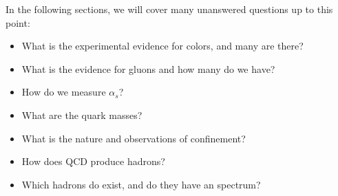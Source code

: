 In the following sections, we will cover many unanswered questions up to this point:
 
\begin{itemize}
    \item What is the experimental evidence for colors, and many are there?
    \item What is the evidence for gluons and how many do we have?
    \item How do we measure $\alpha_s$?
    \item What are the quark masses?
    \item What is the nature and observations of confinement?
    \item How does QCD produce hadrons?
    \item Which hadrons do exist, and do they have an spectrum?
\end{itemize}

\FloatBarrier
